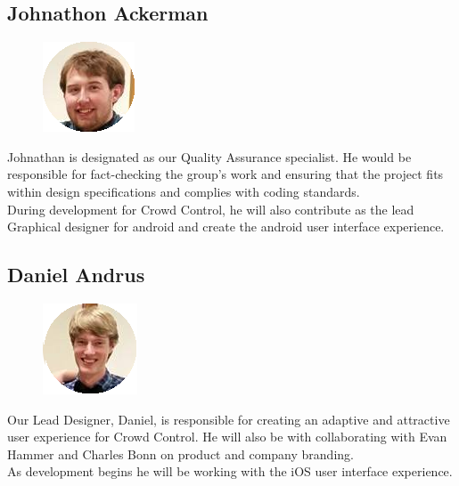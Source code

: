 \subsection{Johnathon Ackerman}
\begin{figure}
\includegraphics{johnnathonackerman}
\end{figure}
Johnathan is designated as our Quality Assurance specialist. He would be responsible for fact-checking the group’s work and ensuring that the project fits within design specifications and complies with coding standards.\\
 During development for Crowd Control, he will also contribute as the lead Graphical designer for android and create the android user interface experience.\\
 \newline
\newline
\newline

\noindent
\subsection{Daniel Andrus}
\begin{figure}
\includegraphics{danielandrus}
\end{figure}
Our Lead Designer, Daniel, is responsible for creating an adaptive and attractive user experience for Crowd Control. He will also be with collaborating with Evan Hammer and Charles Bonn on product and company branding.\\
 As development begins he will be working with the iOS user interface experience.\\
\newline
\newline
\newline
 
\noindent
